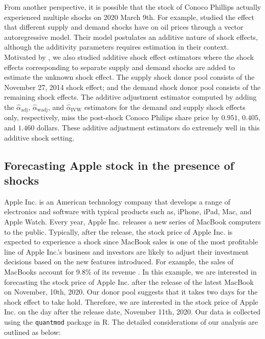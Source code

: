 \documentclass[11pt,3p,review,authoryear]{elsarticle}
\theoremstyle{definition}
\begin{document}
From another perspective, it is possible that the stock of Conoco Phillips actually experienced multiple shocks on 2020 March 9th. For example, \citet{kilian2009not} studied the effect that different supply and demand shocks have on oil prices through a vector autoregressive model. Their model postulates an additive nature of shock effects, although the additivity parameters requires estimation in their context. Motivated by \citet{kilian2009not}, we also studied additive shock effect estimators where the shock effects corresponding to separate supply and demand shocks are added to estimate the unknown shock effect. The supply shock donor pool consists of the November 27, 2014 shock effect; and the demand shock donor pool consists of the remaining shock effects. The additive adjustment estimator computed by adding the $\hat{\alpha}_{\text{adj}}$, $\hat{\alpha}_{\text{wadj}}$, and $\hat{\alpha}_{\text{IVW}}$ estimators for the demand and supply shock effects only, respectively, miss the post-shock Conoco Philips share price by $0.951$, $0.405$, and $1.460$ dollars. These additive adjustment estimators do extremely well in this additive shock setting. 

\subsection{Forecasting Apple stock in the presence of shocks}
\label{apple}

Apple Inc. is an American technology company that develops a range of electronics and software with typical products such as, iPhone, iPad, Mac, and Apple Watch. Every year, Apple Inc. releases a new series of MacBook computers to the public. Typically, after the release, the stock price of Apple Inc. is expected to experience a shock since MacBook sales is one of the most profitable line of Apple Inc.'s business and investors are likely to adjust their investment decisions based on the new features introduced. For example, the sales of MacBooks account for 9.8\% of its revenue \citep{applemac}. In this example, we are interested in forecasting the stock price of Apple Inc. after the release of the latest MacBook on November, 10th, 2020. Our donor pool suggests that it takes two days for the shock effect to take hold. Therefore, we are interested in the stock price of Apple Inc. on the day after the release date, November 11th, 2020. Our data is collected using the \texttt{quantmod} package \citep{ryan2017quantmod} in R. The detailed considerations of our analysis are outlined as below:
\end{document}
